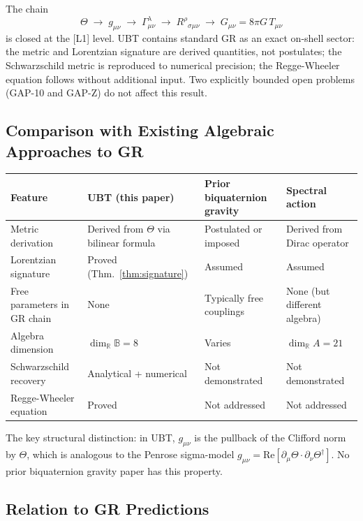 \documentclass[12pt,a4paper]{article}
\theoremstyle{definition}
\theoremstyle{remark}
\newcommand{\B}{\mathbb{B}}
\newcommand{\R}{\mathbb{R}}
\newcommand{\Gmn}{G_{\mu\nu}}
\newcommand{\gmn}{g_{\mu\nu}}
\newcommand{\Tmn}{T_{\mu\nu}}
\newcommand{\Re}{\mathrm{Re}}
\begin{document}
The chain
\[
  \Theta \;\longrightarrow\; \gmn \;\longrightarrow\;
  \Gamma^\lambda_{\mu\nu} \;\longrightarrow\;
  R^\rho{}_{\sigma\mu\nu} \;\longrightarrow\;
  \Gmn = 8\pi G\,\Tmn
\]
is closed at the [L1] level.  UBT contains standard GR as an exact on-shell sector:
the metric and Lorentzian signature are derived quantities, not postulates; the
Schwarzschild metric is reproduced to numerical precision; the Regge-Wheeler
equation follows without additional input.  Two explicitly bounded open problems
(GAP-10 and GAP-Z) do not affect this result.

\subsection{Comparison with Existing Algebraic Approaches to GR}
\label{sec:comparison}

\begin{center}
\begin{tabular}{p{3.5cm}p{3.5cm}p{3.5cm}p{3.5cm}}
\toprule
\textbf{Feature} & \textbf{UBT (this paper)} &
\textbf{Prior biquaternion gravity}~\cite{Adler1995,DeLeo1996} &
\textbf{Spectral action}~\cite{ConnesLott1990} \\
\midrule
Metric derivation &
  Derived from $\Theta$ via bilinear formula &
  Postulated or imposed &
  Derived from Dirac operator \\
Lorentzian signature &
  Proved (Thm.~\ref{thm:signature}) &
  Assumed &
  Assumed \\
Free parameters in GR chain &
  None &
  Typically free couplings &
  None (but different algebra) \\
Algebra dimension &
  $\dim_\R\B = 8$ &
  Varies &
  $\dim_\R A = 21$ \\
Schwarzschild recovery &
  Analytical + numerical &
  Not demonstrated &
  Not demonstrated \\
Regge-Wheeler equation &
  Proved &
  Not addressed &
  Not addressed \\
\bottomrule
\end{tabular}
\end{center}

The key structural distinction: in UBT, $\gmn$ is the pullback of the Clifford
norm by $\Theta$, which is analogous to the Penrose sigma-model
$\gmn = \Re[\partial_\mu\Theta\cdot\partial_\nu\Theta^\dagger]$.  No prior
biquaternion gravity paper has this property.

\subsection{Relation to GR Predictions}
\label{sec:gr_predictions}
\end{document}
